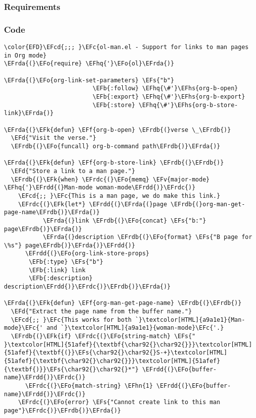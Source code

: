 \documentclass[a4wide,10pt]{article}
\newcommand{\EFc}[1]{\textcolor{EFc}{#1}} %
\newcommand{\EFcd}[1]{\textcolor{EFcd}{#1}} %
\newcommand{\EFs}[1]{\textcolor{EFs}{#1}} %
\newcommand{\EFd}[1]{\textcolor{EFd}{#1}} %
\newcommand{\EFk}[1]{\textcolor{EFk}{#1}} %
\newcommand{\EFb}[1]{\textcolor{EFb}{#1}} %
\newcommand{\EFf}[1]{\textcolor{EFf}{#1}} %
\newcommand{\EFv}[1]{\textcolor{EFv}{#1}} %
\newcommand{\EFo}[1]{\textcolor{EFo}{#1}} %
\newcommand{\EFhn}[1]{\textcolor{EFhn}{\textbf{#1}}} %
\newcommand{\EFhq}[1]{\textcolor{EFhq}{#1}} %
\newcommand{\EFhs}[1]{\textcolor{EFhs}{#1}} %
\newcommand{\EFrda}[1]{\textcolor{EFrda}{#1}} %
\newcommand{\EFrdb}[1]{\textcolor{EFrdb}{#1}} %
\newcommand{\EFrdc}[1]{\textcolor{EFrdc}{#1}} %
\newcommand{\EFrdd}[1]{\textcolor{EFrdd}{#1}} %
\begin{document}
\subsubsection{Requirements}
\label{sec:org42d457f}
\subsubsection{Code}
\label{sec:orge45e5df}
\begin{Code}
\begin{Verbatim}
\color{EFD}\EFcd{;;; }\EFc{ol-man.el - Support for links to man pages in Org mode}
\EFrda{(}\EFo{require} \EFhq{'}\EFo{ol}\EFrda{)}

\EFrda{(}\EFo{org-link-set-parameters} \EFs{"b"}
                         \EFb{:follow} \EFhq{\#'}\EFhs{org-b-open}
                         \EFb{:export} \EFhq{\#'}\EFhs{org-b-export}
                         \EFb{:store} \EFhq{\#'}\EFhs{org-b-store-link}\EFrda{)}

\EFrda{(}\EFk{defun} \EFf{org-b-open} \EFrdb{(}verse \_\EFrdb{)}
  \EFd{"Visit the verse."}
  \EFrdb{(}\EFo{funcall} org-b-command path\EFrdb{)}\EFrda{)}

\EFrda{(}\EFk{defun} \EFf{org-b-store-link} \EFrdb{(}\EFrdb{)}
  \EFd{"Store a link to a man page."}
  \EFrdb{(}\EFk{when} \EFrdc{(}\EFo{memq} \EFv{major-mode} \EFhq{'}\EFrdd{(}Man-mode woman-mode\EFrdd{)}\EFrdc{)}
    \EFcd{;; }\EFc{This is a man page, we do make this link.}
    \EFrdc{(}\EFk{let*} \EFrdd{(}\EFrda{(}page \EFrdb{(}org-man-get-page-name\EFrdb{)}\EFrda{)}
           \EFrda{(}link \EFrdb{(}\EFo{concat} \EFs{"b:"} page\EFrdb{)}\EFrda{)}
           \EFrda{(}description \EFrdb{(}\EFo{format} \EFs{"B page for \%s"} page\EFrdb{)}\EFrda{)}\EFrdd{)}
      \EFrdd{(}\EFo{org-link-store-props}
       \EFb{:type} \EFs{"b"}
       \EFb{:link} link
       \EFb{:description} description\EFrdd{)}\EFrdc{)}\EFrdb{)}\EFrda{)}

\EFrda{(}\EFk{defun} \EFf{org-man-get-page-name} \EFrdb{(}\EFrdb{)}
  \EFd{"Extract the page name from the buffer name."}
  \EFcd{;; }\EFc{This works for both `}\textcolor[HTML]{a9a1e1}{Man-mode}\EFc{' and `}\textcolor[HTML]{a9a1e1}{woman-mode}\EFc{'.}
  \EFrdb{(}\EFk{if} \EFrdc{(}\EFo{string-match} \EFs{" }\textcolor[HTML]{51afef}{\textbf{\char92{}\char92{}}}\textcolor[HTML]{51afef}{\textbf{(}}\EFs{\char92{}\char92{}S-+}\textcolor[HTML]{51afef}{\textbf{\char92{}\char92{}}}\textcolor[HTML]{51afef}{\textbf{)}}\EFs{\char92{}\char92{}*"} \EFrdd{(}\EFo{buffer-name}\EFrdd{)}\EFrdc{)}
      \EFrdc{(}\EFo{match-string} \EFhn{1} \EFrdd{(}\EFo{buffer-name}\EFrdd{)}\EFrdc{)}
    \EFrdc{(}\EFo{error} \EFs{"Cannot create link to this man page"}\EFrdc{)}\EFrdb{)}\EFrda{)}


\end{Verbatim}
\end{Code}
\end{document}
